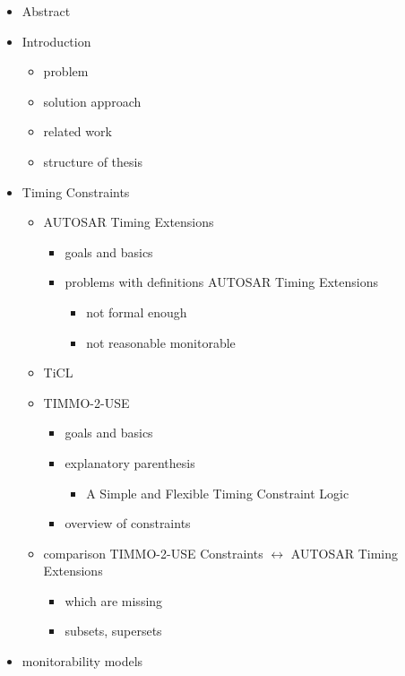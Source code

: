 \documentclass[]{article}
\begin{document}
\begin{itemize}
	\item
		Abstract
	\item
		Introduction
		\begin{itemize}
			\item
				problem
			\item
				solution approach
			\item
				related work
			\item
				structure of thesis
		\end{itemize}
	\item
		Timing Constraints
		\begin{itemize}
			\item
				AUTOSAR Timing Extensions
				\begin{itemize}
					\item
						goals and basics
					\item
						problems with definitions AUTOSAR Timing Extensions
						\begin{itemize}
							\item
								not formal enough
							\item
								not reasonable monitorable
						\end{itemize}
				\end{itemize}
			\item
				TiCL
			\item
				TIMMO-2-USE
				\begin{itemize}
					\item
						goals and basics
					\item
						explanatory parenthesis
						\begin{itemize}
							\item	
								A Simple and Flexible Timing Constraint Logic
						\end{itemize}
					\item
						overview of constraints
				\end{itemize}
			\item
				comparison TIMMO-2-USE Constraints $\leftrightarrow$ AUTOSAR Timing Extensions
				\begin{itemize}
					\item
						which are missing
					\item
						subsets, supersets
				\end{itemize}
		\end{itemize}
	\item
		monitorability models
		\begin{itemize}

\end{itemize}
\end{itemize}
\end{document}

